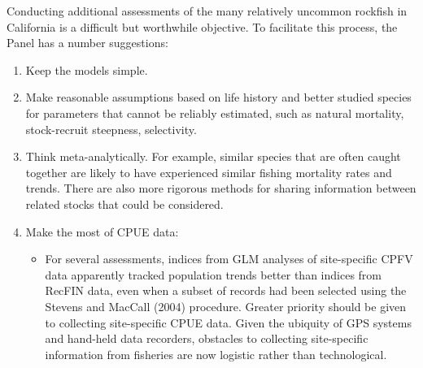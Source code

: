 \documentclass[11pt,
  english,
  a4paper,
]{article}
\begin{document}
Conducting additional assessments of the many relatively uncommon rockfish in California is a difficult but worthwhile objective. To facilitate this process, the Panel has a number suggestions:


\begin{enumerate}
\def\labelenumi{\arabic{enumi}.}
\item

  Keep the models simple.\\

  \tagmcend\tagstructend\tagstructend
\item

  Make reasonable assumptions based on life history and better studied species for parameters that cannot be reliably estimated, such as natural mortality, stock-recruit steepness, selectivity.\\

  \tagmcend\tagstructend\tagstructend
\item

  Think meta-analytically. For example, similar species that are often caught together are likely to have experienced similar fishing mortality rates and trends. There are also more rigorous methods for sharing information between related stocks that could be considered.\\

  \tagmcend\tagstructend\tagstructend
\item

  Make the most of CPUE data:

  \tagmcend\tagstructend\tagstructend


  \begin{itemize}
  \item


    For several assessments, indices from GLM analyses of site-specific CPFV data apparently tracked population trends better than indices from RecFIN data, even when a subset of records had been selected using the Stevens and MacCall (2004) procedure. Greater priority should be given to collecting site-specific CPUE data. Given the ubiquity of GPS systems and hand-held data recorders, obstacles to collecting site-specific information from fisheries are now logistic rather than technological.\\


\end{itemize}
\end{enumerate}
\end{document}
